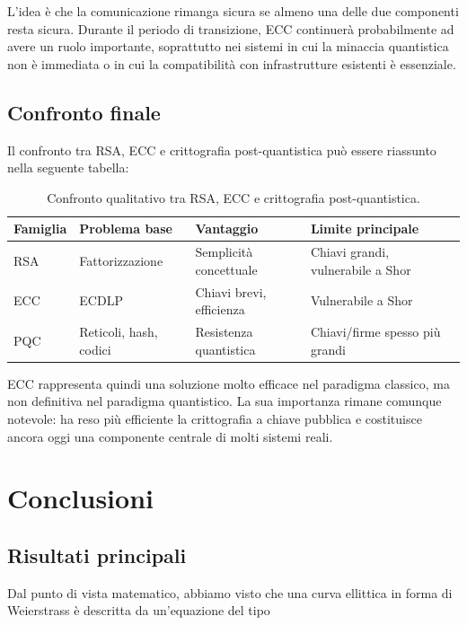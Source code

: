 \documentclass[12pt,a4paper,oneside]{report}
\begin{document}
L'idea è che la comunicazione rimanga sicura se almeno una delle due componenti resta sicura. Durante il periodo di transizione, ECC continuerà probabilmente ad avere un ruolo importante, soprattutto nei sistemi in cui la minaccia quantistica non è immediata o in cui la compatibilità con infrastrutture esistenti è essenziale.

\section{Confronto finale}

Il confronto tra RSA, ECC e crittografia post-quantistica può essere riassunto nella seguente tabella:

\begin{table}[h]
\centering
\begin{tabular}{llll}
\toprule
\textbf{Famiglia} & \textbf{Problema base} & \textbf{Vantaggio} & \textbf{Limite principale} \\
\midrule
RSA & Fattorizzazione & Semplicità concettuale & Chiavi grandi, vulnerabile a Shor \\
ECC & ECDLP & Chiavi brevi, efficienza & Vulnerabile a Shor \\
PQC & Reticoli, hash, codici & Resistenza quantistica & Chiavi/firme spesso più grandi \\
\bottomrule
\end{tabular}
\caption{Confronto qualitativo tra RSA, ECC e crittografia post-quantistica.}
\label{tab:rsa-ecc-pqc}
\end{table}

ECC rappresenta quindi una soluzione molto efficace nel paradigma classico, ma non definitiva nel paradigma quantistico. La sua importanza rimane comunque notevole: ha reso più efficiente la crittografia a chiave pubblica e costituisce ancora oggi una componente centrale di molti sistemi reali.

\chapter{Conclusioni}

\section{Risultati principali}

Dal punto di vista matematico, abbiamo visto che una curva ellittica in forma di Weierstrass è descritta da un'equazione del tipo
\end{document}
